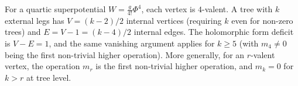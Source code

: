 \begin{remark}
For a quartic superpotential $W = \frac{g}{4!}\Phi^4$, each vertex is $4$-valent. A tree with $k$ external legs has $V = (k-2)/2$ internal vertices (requiring $k$ even for non-zero trees) and $E = V - 1 = (k-4)/2$ internal edges. The holomorphic form deficit is $V - E = 1$, and the same vanishing argument applies for $k \geq 5$ (with $m_4 \neq 0$ being the first non-trivial higher operation). More generally, for an $r$-valent vertex, the operation $m_r$ is the first non-trivial higher operation, and $m_k = 0$ for $k > r$ at tree level.
\end{remark}
